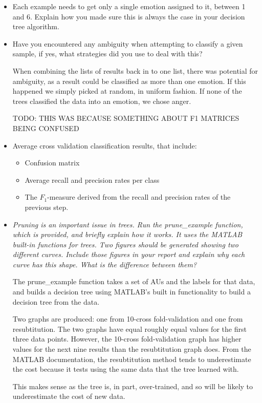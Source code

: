 \documentclass[a4paper]{article}
\begin{document}
\begin{itemize}
  \item Each example needs to get only a single emotion assigned to it, between
    1 and 6. Explain how you made sure this is always the case in your decision
    tree algorithm.



  \item Have you encountered any ambiguity when attempting to classify a given
    sample, if yes, what strategies did you use to deal with this?

    When combining the lists of results back in to one list, there was potential
    for ambiguity, as a result could be classified as more than one emotion. If
    this happened we simply picked at random, in uniform fashion. If none of the
    trees classified the data into an emotion, we chose anger.

    TODO: THIS WAS BECAUSE SOMETHING ABOUT F1 MATRICES BEING CONFUSED


  \item Average cross validation classification results, that include:
    \begin{itemize}
      \item Confusion matrix
      \item Average recall and precision rates per class
      \item The $F_1$-measure derived from the recall and precision rates of the
        previous step.
    \end{itemize}

  \item \emph{Pruning is an important issue in trees. Run the prune\_example
    function, which is provided, and briefly explain how it works. It uses the
    MATLAB built-in functions for trees. Two figures should be generated showing
    two different curves. Include those figures in your report and explain why
    each curve has this shape. What is the difference between them?}

    The prune\_example function takes a set of AUs and the labels for that data,
    and builds a decision tree using MATLAB's built in functionality to build a
    decision tree from the data.

    Two graphs are produced: one from 10-cross fold-validation and one from
    resubtitution. The two graphs have equal roughly equal values for the first
    three data points. However, the 10-cross fold-validation graph has higher
    values for the next nine results than the resubtitution graph does.
    From the MATLAB documentation, the resubtitution method tends to underestimate
    the cost because it tests using the same data that the tree learned with.

    This makes sense as the tree is, in part, over-trained, and so will be likely to
    underestimate the cost of new data.


\end{itemize}
\end{document}
